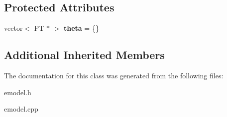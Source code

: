 \subsection*{Protected Attributes}
\begin{DoxyCompactItemize}
\item 
\hypertarget{class_k_base_1_1_e_model_afd8349b62c23c8d390f5911951365592}{vector$<$ P\-T $\ast$ $>$ {\bfseries theta} = \{\}}\label{class_k_base_1_1_e_model_afd8349b62c23c8d390f5911951365592}

\end{DoxyCompactItemize}
\subsection*{Additional Inherited Members}


The documentation for this class was generated from the following files\-:\begin{DoxyCompactItemize}
\item 
emodel.\-h\item 
emodel.\-cpp\end{DoxyCompactItemize}
